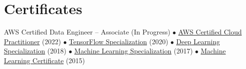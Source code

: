 \section{Certificates}
\small{AWS Certified Data Engineer -- Associate (In Progress) $\bullet$ \href{https://www.credly.com/badges/5d150ca0-aa46-49ee-b12e-2bbaa10ab51f/}{AWS Certified Cloud Practitioner} (2022) $\bullet$ \href{https://www.coursera.org/account/accomplishments/specialization/certificate/6TK3DERRF3Y5}{TensorFlow Specialization} (2020) $\bullet$ \href{https://www.coursera.org/account/accomplishments/specialization/9C4WM5Y3CHLL}{Deep Learning Specialization} (2018) $\bullet$ \href{https://www.coursera.org/account/accomplishments/specialization/certificate/75H6XBPR5J45}{Machine Learning Specialization} (2017) $\bullet$ \href{https://www.coursera.org/account/accomplishments/verify/EA5XJXMARBTU}{Machine Learning Certificate} (2015)}
\vspace{-8pt}
